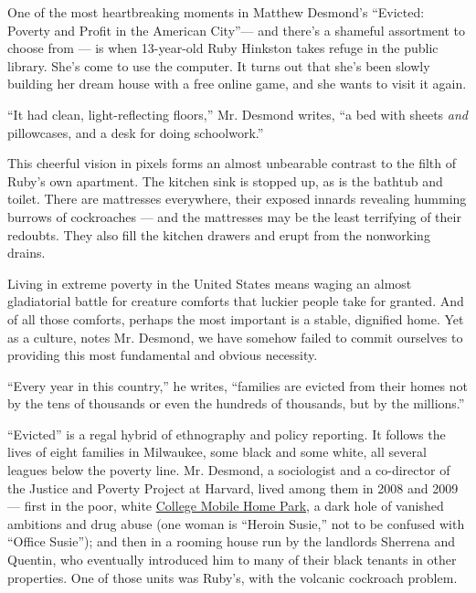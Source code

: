 One of the most heartbreaking moments in Matthew Desmond's ``Evicted:
Poverty and Profit in the American City''--- and there's a shameful
assortment to choose from --- is when 13-year-old Ruby Hinkston takes
refuge in the public library. She's come to use the computer. It turns
out that she's been slowly building her dream house with a free online
game, and she wants to visit it again.

``It had clean, light-reflecting floors,'' Mr. Desmond writes, ``a bed
with sheets \emph{and} pillowcases, and a desk for doing schoolwork.''

This cheerful vision in pixels forms an almost unbearable contrast to
the filth of Ruby's own apartment. The kitchen sink is stopped up, as is
the bathtub and toilet. There are mattresses everywhere, their exposed
innards revealing humming burrows of cockroaches --- and the mattresses
may be the least terrifying of their redoubts. They also fill the
kitchen drawers and erupt from the nonworking drains.

Living in extreme poverty in the United States means waging an almost
gladiatorial battle for creature comforts that luckier people take for
granted. And of all those comforts, perhaps the most important is a
stable, dignified home. Yet as a culture, notes Mr. Desmond, we have
somehow failed to commit ourselves to providing this most fundamental
and obvious necessity.

``Every year in this country,'' he writes, ``families are evicted from
their homes not by the tens of thousands or even the hundreds of
thousands, but by the millions.''

``Evicted'' is a regal hybrid of ethnography and policy reporting. It
follows the lives of eight families in Milwaukee, some black and some
white, all several leagues below the poverty line. Mr. Desmond, a
sociologist and a co-director of the Justice and Poverty Project at
Harvard, lived among them in 2008 and 2009 --- first in the poor, white
\href{http://www.jsonline.com/news/milwaukee/29569949.html}{College
Mobile Home Park}, a dark hole of vanished ambitions and drug abuse (one
woman is ``Heroin Susie,'' not to be confused with ``Office Susie'');
and then in a rooming house run by the landlords Sherrena and Quentin,
who eventually introduced him to many of their black tenants in other
properties. One of those units was Ruby's, with the volcanic cockroach
problem.

